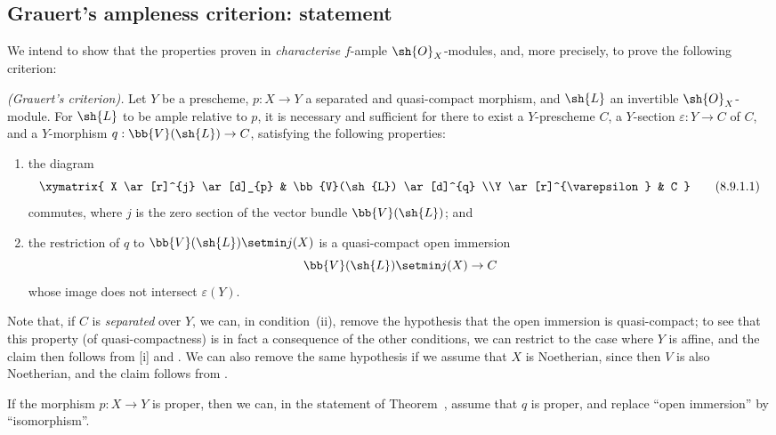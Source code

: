 \subsection{Grauert's ampleness criterion: statement}
\label{subsection:II.8.9}

We intend to show that the properties proven in  \emph{characterise} $f$-ample $\sh{O}_X$-modules, and, more precisely, to prove the following criterion:
\begin{theorem}[8.9.1]
\label{II.8.9.1}
\emph{(Grauert's criterion).}
Let $Y$ be a prescheme, $p:X\to Y$ a separated and quasi-compact morphism, and $\sh{L}$ an invertible $\sh{O}_X$-module.
For $\sh{L}$ to be ample relative to $p$, it is necessary and sufficient for there to exist a $Y$-prescheme $C$, a $Y$-section $\varepsilon:Y\to C$ of $C$, and a $Y$-morphism $q:\bb{V}(\sh{L})\to C$, satisfying the following properties:
\begin{enumerate}
  \item[\rm{(i)}] the diagram
    \[
      \label{II.8.9.1.1}
        \xymatrix{
          X
            \ar[r]^{j}
            \ar[d]_{p}
        & \bb{V}(\sh{L})
            \ar[d]^{q}
        \\Y
            \ar[r]^{\varepsilon}
        & C
        }
      \tag{8.9.1.1}
    \]
    commutes, where $j$ is the zero section of the vector bundle $\bb{V}(\sh{L})$; and
  \item[\rm{(ii)}] the restriction of $q$ to $\bb{V}(\sh{L})\setmin j(X)$ is a quasi-compact open immersion
    \[
      \bb{V}(\sh{L})\setmin j(X)\to C
    \]
    whose image does not intersect $\varepsilon(Y)$.
\end{enumerate}
\end{theorem}

Note that, if $C$ is \emph{separated} over $Y$, we can, in condition~(ii), remove the hypothesis that the open immersion is quasi-compact;
to see that this property (of quasi-compactness) is in fact a consequence of the other conditions, we can restrict to the case where $Y$ is affine, and the claim then follows from [i] and .
We can also remove
the same hypothesis if we assume that $X$ is Noetherian, since then $V$ is also Noetherian, and the claim follows from .

\begin{corollary}[8.9.2]
\label{II.8.9.2}
If the morphism $p:X\to Y$ is proper, then we can, in the statement of Theorem~, assume that $q$ is proper, and replace ``open immersion'' by ``isomorphism''.
\end{corollary}

